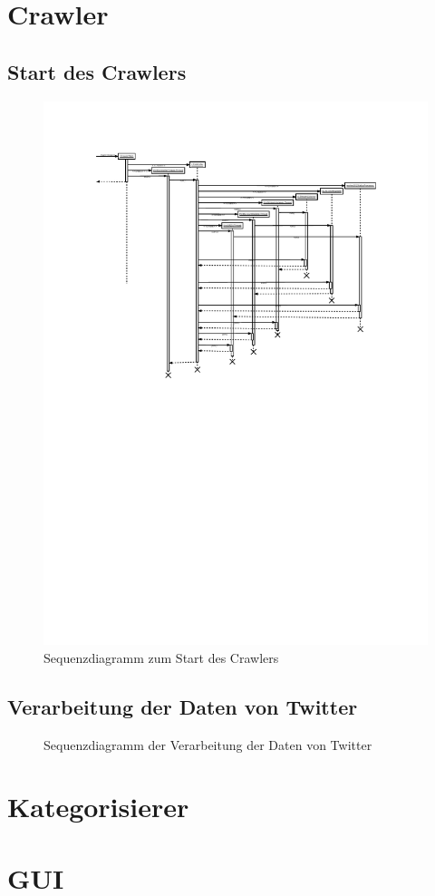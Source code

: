 \section{Crawler}

\subsection{Start des Crawlers}

\begin{figure}[p]
\includegraphics[scale=1]{vorlaeufigeDiagramme/crawler_start_sequence.pdf}
\caption{Sequenzdiagramm zum Start des Crawlers}
\end{figure}

\subsection{Verarbeitung der Daten von Twitter}

\begin{figure}[htb]
\caption{Sequenzdiagramm der Verarbeitung der Daten von Twitter}
\end{figure}

\section{Kategorisierer}

\section{GUI}